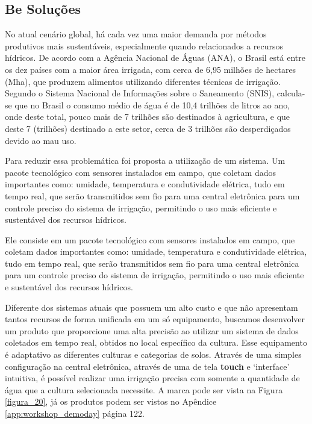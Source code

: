 \subsection{Be Soluções}

No atual cenário global, há cada vez uma maior demanda por métodos produtivos mais sustentáveis, especialmente quando relacionados a recursos hídricos. De acordo com a Agência Nacional de Águas (ANA), o Brasil está entre os dez países com a maior área irrigada, com cerca de 6,95 milhões de hectares (Mha), que produzem alimentos utilizando diferentes técnicas de irrigação. Segundo o Sistema Nacional de Informações sobre o Saneamento (SNIS), calcula-se que no Brasil o consumo médio de água é de 10,4 trilhões de litros ao ano, onde deste total, pouco mais de 7 trilhões são destinados à agricultura, e que deste 7 (trilhões) destinado a este setor, cerca de 3 trilhões são desperdiçados devido ao mau uso.

Para reduzir essa problemática foi proposta a utilização de um sistema. Um pacote tecnológico com sensores instalados em campo, que coletam dados importantes como: umidade, temperatura e condutividade elétrica, tudo em tempo real, que serão transmitidos sem fio para uma central eletrônica para um controle preciso do sistema de irrigação, permitindo o uso mais eficiente e sustentável dos recursos hídricos.

Ele consiste em um pacote tecnológico com sensores instalados em campo, que coletam dados importantes como: umidade, temperatura e condutividade elétrica, tudo em tempo real, que serão transmitidos sem fio para uma central eletrônica para um controle preciso do sistema de irrigação, permitindo o uso mais eficiente e sustentável dos recursos hídricos.

Diferente dos sistemas atuais que possuem um alto custo e que não apresentam tantos recursos de forma unificada em um só equipamento, buscamos desenvolver um produto que proporcione uma alta precisão ao utilizar um sistema de dados coletados em tempo real, obtidos no local específico da cultura. Esse equipamento é adaptativo as diferentes culturas e categorias de solos. Através de uma simples configuração na central eletrônica, através de uma de tela \textbf{touch} e ‘interface’ intuitiva, é possível realizar uma irrigação precisa com somente a quantidade de água que a cultura selecionada necessite. A marca pode ser vista na Figura \ref{figura_20}, já os produtos podem ser vistos no Apêndice \ref{app:workshop_demoday} página 122.

